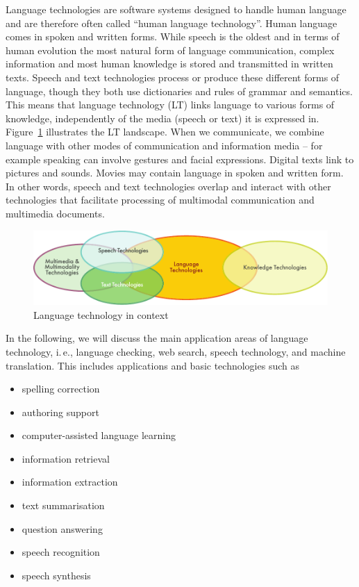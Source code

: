 \begin{multicols}{2}
  Language technologies are software systems designed to handle human language and are therefore often called ``human language technology''. Human language comes in spoken and written forms. While speech is the oldest and in terms of human evolution the most natural form of language communication, complex information and most human knowledge is stored and transmitted in written texts. Speech and text technologies process or produce these different forms of language, though they both use dictionaries and rules of grammar and semantics.  This means that language technology (LT) links language to various forms of knowledge, independently of the media (speech or text) it is expressed in. Figure~\ref{fig:ltincontext_en} illustrates the LT landscape. When we communicate, we combine language with other modes of communication and information media – for example speaking can involve gestures and facial expressions. Digital texts link to pictures and sounds. Movies may contain language in spoken and written form. In other words, speech and text technologies overlap and interact with other technologies that facilitate processing of multimodal communication and multimedia documents.

\begin{figure}[htb]
  \center
  \includegraphics[width=\textwidth]{../_media/english/language_technologies}
  \caption{Language technology in context}
\label{fig:ltincontext_en}
\end{figure}

In the following, we will discuss the main application areas of language technology, i.\,e., language checking, web search, speech technology, and machine translation. This includes applications and basic technologies such as

\begin{itemize}
\item spelling correction
\item authoring support
\item computer-assisted language learning
\item information retrieval
\item information extraction
\item text summarisation
\item question answering
\item speech recognition
\item speech synthesis
\end{itemize}


\end{multicols}
